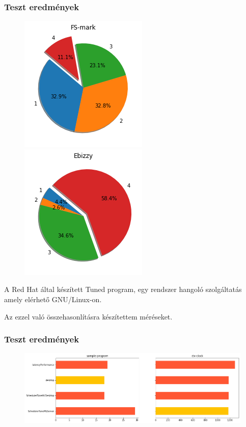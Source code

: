 \documentclass{beamer}
\begin{document}
\begin{frame}
\frametitle{Teszt eredmények}

\begin{figure}
	\begin{center}
		\includegraphics[height=0.62\textheight]{images/diskBenchmarkValue.png}
		\includegraphics[height=0.62\textheight]{images/cpuBenchmarkValue.png}
	\end{center}	
\end{figure} 

\end{frame}


\begin{frame}
A Red Hat által készített Tuned program, egy rendszer hangoló szolgáltatás amely elérhető GNU/Linux-on.

\bigskip

Az ezzel való összehasonlításra készítettem méréseket.

\frametitle{Teszt eredmények}
\begin{figure}
	\begin{center}
		\includegraphics[height=0.4\textheight]{images/tunedAndSchedulerTuneMLCompareSampleprogramCtxclock.png}
	\end{center}	
\end{figure} 
\end{frame}
\end{document}
